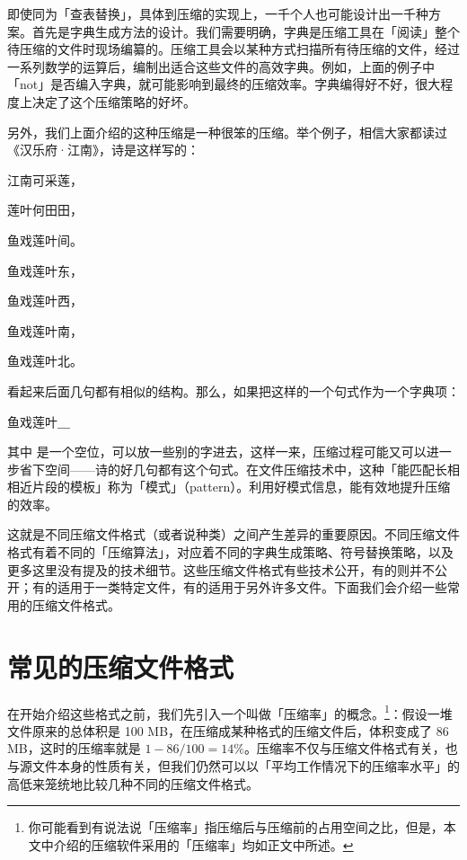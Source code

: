 即使同为「查表替换」，具体到压缩的实现上，一千个人也可能设计出一千种方案。首先是字典生成方法的设计。我们需要明确，字典是压缩工具在「阅读」整个待压缩的文件时现场编纂的。压缩工具会以某种方式扫描所有待压缩的文件，经过一系列数学的运算后，编制出适合这些文件的高效字典。例如，上面的例子中「not」是否编入字典，就可能影响到最终的压缩效率。字典编得好不好，很大程度上决定了这个压缩策略的好坏。

另外，我们上面介绍的这种压缩是一种很笨的压缩。举个例子，相信大家都读过《汉乐府·江南》，诗是这样写的：

\begin{quoting}
  \centering
  江南可采莲，\par
  莲叶何田田，\par
  鱼戏莲叶间。\par
  鱼戏莲叶东，\par
  鱼戏莲叶西，\par
  鱼戏莲叶南，\par
  鱼戏莲叶北。
\end{quoting}

看起来后面几句都有相似的结构。那么，如果把这样的一个句式作为一个字典项：

\begin{MissingVerbatim}
  鱼戏莲叶＿
\end{MissingVerbatim}

其中  是一个空位，可以放一些别的字进去，这样一来，压缩过程可能又可以进一步省下空间——诗的好几句都有这个句式。在文件压缩技术中，这种「能匹配长相相近片段的模板」称为「模式」（pattern）。利用好模式信息，能有效地提升压缩的效率。

这就是不同压缩文件格式（或者说种类）之间产生差异的重要原因。不同压缩文件格式有着不同的「压缩算法」，对应着不同的字典生成策略、符号替换策略，以及更多这里没有提及的技术细节。这些压缩文件格式有些技术公开，有的则并不公开；有的适用于一类特定文件，有的适用于另外许多文件。下面我们会介绍一些常用的压缩文件格式。

\section{常见的压缩文件格式}

在开始介绍这些格式之前，我们先引入一个叫做「压缩率」的概念。\footnote{你可能看到有说法说「压缩率」指压缩后与压缩前的占用空间之比，但是，本文中介绍的压缩软件采用的「压缩率」均如正文中所述。}：假设一堆文件原来的总体积是 100 MB，在压缩成某种格式的压缩文件后，体积变成了 86 MB，这时的压缩率就是 $1 - 86/100 = 14\%$。压缩率不仅与压缩文件格式有关，也与源文件本身的性质有关，但我们仍然可以以「平均工作情况下的压缩率水平」的高低来笼统地比较几种不同的压缩文件格式。

